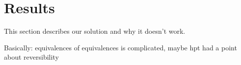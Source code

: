 \section{Results}

This section describes our solution and why it doesn't work.

Basically: equivalences of equivalences is complicated, maybe hpt had a point
about reversibility